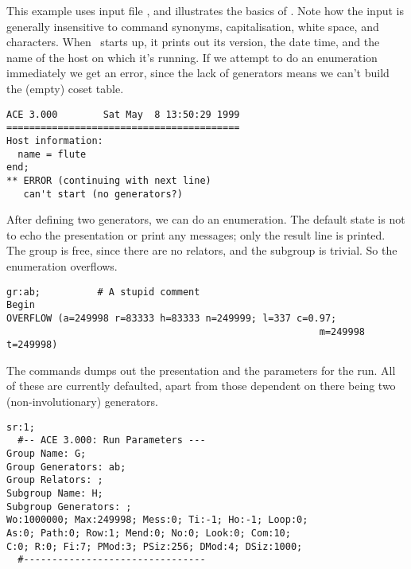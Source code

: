 


This example uses input file , and illustrates the basics of
  \ace.
Note how the input is generally insensitive to command synonyms,
  capitalisation, white space, and \ttt{:} \amp \ttt{;} characters.
%
When \ace\ starts up, it prints out its version, the date \amp time, and
  the name of the host on which it's running.
If we attempt to do an enumeration immediately we get an error, since the
  lack of generators means we can't build the (empty) coset table.

\bv\begin{verbatim}
ACE 3.000        Sat May  8 13:50:29 1999
=========================================
Host information:
  name = flute
end;
** ERROR (continuing with next line)
   can't start (no generators?)
\end{verbatim}\ev

After defining two generators, we can do an enumeration.
The default state is not to echo the presentation or print any messages;
  only the result line is printed.
The group is free, since there are no relators, and the subgroup is
 trivial.
So the enumeration overflows.

\bv\begin{verbatim}
gr:ab;          # A stupid comment
Begin
OVERFLOW (a=249998 r=83333 h=83333 n=249999; l=337 c=0.97; 
                                                       m=249998 t=249998)
\end{verbatim}\ev

The  commands dumps out the presentation and the parameters for
  the run.
All of these are currently defaulted, apart from those dependent on there
  being two (non-involutionary) generators.

\bv\begin{verbatim}
sr:1;
  #-- ACE 3.000: Run Parameters ---
Group Name: G;
Group Generators: ab;
Group Relators: ;
Subgroup Name: H;
Subgroup Generators: ;
Wo:1000000; Max:249998; Mess:0; Ti:-1; Ho:-1; Loop:0;
As:0; Path:0; Row:1; Mend:0; No:0; Look:0; Com:10;
C:0; R:0; Fi:7; PMod:3; PSiz:256; DMod:4; DSiz:1000;
  #--------------------------------
\end{verbatim}\ev

